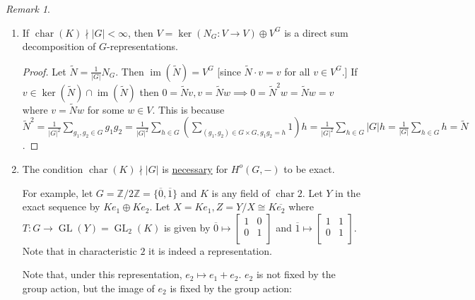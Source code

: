\documentclass{article}
\theoremstyle{definition}
\theoremstyle{plain}
\theoremstyle{remark}
\newtheorem*{remark*}{Remark}
\begin{document}
    \begin{remark*}
        \begin{enumerate}[label=\arabic*)]
            \item If \(\operatorname{char}(K) \nmid \vert G \vert < \infty\), then \(V = \ker(N_G : V\to V) \oplus V^G\) is a direct sum decomposition of \(G\)-representations.
            
            \begin{proof}
                Let \(\widetilde{N} = \frac{1}{\vert G \vert} N_G\). Then \(\operatorname{im}(\widetilde{N}) = V^G\) [since \(\widetilde{N} \cdot v = v\) for all \(v\in V^G\).] If \(v\in \ker(\widetilde{N}) \cap \operatorname{im}(\widetilde{N})\) then \(0 = \widetilde{N} v, v = \widetilde{N} w \implies 0 = \widetilde{N}^2 w = \widetilde{N} w = v\) where \(v= \widetilde{N}w\) for some \(w\in V\). This is because \(\widetilde{N}^2 = \frac{1}{\vert G \vert^2} \sum_{g_1 , g_2 \in G} g_1 g_2 = \frac{1}{\vert G \vert^2} \sum_{h \in G} \left( \sum_{(g_1 , g_2) \in G \times G , g_1 g_2 = h} 1 \right) h = \frac{1}{\vert G \vert^2} \sum_{h\in G} \vert G \vert h = \frac{1}{\vert G \vert} \sum_{h\in G} h = \widetilde{N}\).    
            \end{proof}

            \item The condition \(\operatorname{char}(K) \nmid \vert G \vert\) is \underline{necessary} for \(H^o(G,-)\) to be exact.
            
            For example, let \(G = \mathbb{Z} / 2 \mathbb{Z} = \{ \overline{0}, \overline{1} \} \) and \(K\) is any field of \(\operatorname{char} 2\). Let \(Y\) in the exact sequence by \(Ke_1 \oplus Ke_2\). Let \(X = Ke_1, Z = Y / X \cong K \overline{e_2}\) where \(T: G \to \operatorname{GL}(Y) = \operatorname{GL}_2(K)\) is given by \(\overline{0} \mapsto \begin{bmatrix}
                1 & 0 \\
                0 & 1 \\
            \end{bmatrix}\) and \(\overline{1} \mapsto \begin{bmatrix}
                1 & 1 \\
                0 & 1 \\
            \end{bmatrix}\). Note that in characteristic \(2\) it is indeed a representation.

            Note that, under this representation, \(e_2 \mapsto e_1 + e_2\). \(e_2\) is not fixed by the group action, but the image of \(e_2\) is fixed by the group action:


\end{enumerate}
\end{remark*}
\end{document}
